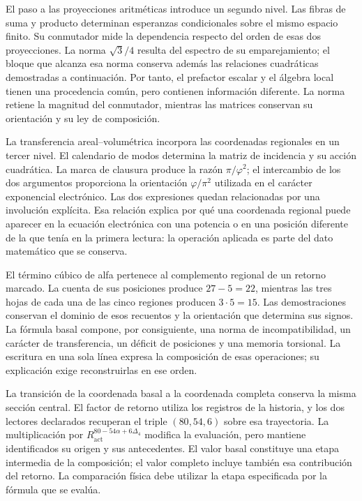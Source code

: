 El paso a las proyecciones aritméticas introduce un segundo nivel. Las
fibras de suma y producto determinan esperanzas condicionales sobre el
mismo espacio finito. Su conmutador mide la dependencia respecto del
orden de esas dos proyecciones. La norma $\sqrt3/4$ resulta del espectro
de su emparejamiento; el bloque que alcanza esa norma conserva además
las relaciones cuadráticas demostradas a continuación. Por tanto, el
prefactor escalar y el álgebra local tienen una procedencia común, pero
contienen información diferente. La norma retiene la magnitud del
conmutador, mientras las matrices conservan su orientación y su ley de
composición.

La transferencia areal--volumétrica incorpora las coordenadas regionales
en un tercer nivel. El calendario de modos determina la matriz de
incidencia y su acción cuadrática. La marca de clausura produce la razón
$\pi/\varphi^2$; el intercambio de los dos argumentos proporciona la
orientación $\varphi/\pi^2$ utilizada en el carácter exponencial
electrónico. Las dos expresiones quedan relacionadas por una involución
explícita. Esa relación explica por qué una coordenada regional puede
aparecer en la ecuación electrónica con una potencia o en una posición
diferente de la que tenía en la primera lectura: la operación aplicada
es parte del dato matemático que se conserva.

El término cúbico de alfa pertenece al complemento regional de un retorno
marcado. La cuenta de sus posiciones produce $27-5=22$, mientras las
tres hojas de cada una de las cinco regiones producen $3\cdot5=15$.
Las demostraciones conservan el dominio de esos recuentos y la
orientación que determina sus signos. La fórmula basal compone,
por consiguiente, una norma de incompatibilidad, un carácter de
transferencia, un déficit de posiciones y una memoria torsional.
La escritura en una sola línea expresa la composición de esas
operaciones; su explicación exige reconstruirlas en ese orden.

La transición de la coordenada basal a la coordenada completa conserva
la misma sección central. El factor de retorno utiliza los registros
de la historia, y los dos lectores declarados recuperan el triple
$(80,54,6)$ sobre esa trayectoria. La multiplicación por
$R_{\mathrm{act}}^{80-54\alpha+6\Delta_4}$ modifica la evaluación,
pero mantiene identificados su origen y sus antecedentes. El valor
basal constituye una etapa intermedia de la composición; el valor
completo incluye también esa contribución del retorno. La comparación
física debe utilizar la etapa especificada por la fórmula que se evalúa.

